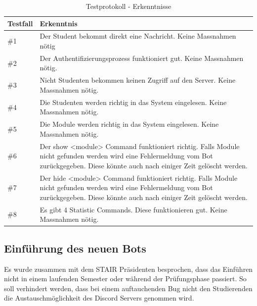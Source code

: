 \documentclass[a4paper, table]{article}
\begin{document}
\begin{table}[h]
    \centering
    \begin{tabular}{|l|p{30em}|}
        \hline
        \rowcolor[gray]{.9} Testfall & Erkenntnis \\
        \hline
        \#1 & Der Student bekommt direkt eine Nachricht. Keine Massnahmen nötig \\
        \hline
        \#2 & Der Authentifizierungsprozess funktioniert gut. Keine Massnahmen nötig. \\
        \hline
        \#3 & Nicht Studenten bekommen keinen Zugriff auf den Server. Keine Massnahmen nötig. \\
        \hline
        \#4 & Die Studenten werden richtig in das System eingelesen. Keine Massnahmen nötig. \\
        \hline
        \#5 & Die Module werden richtig in das System eingelesen. Keine Massnahmen nötig. \\
        \hline
        \#6 & 
            Der show <module> Command funktioniert richtig.
            Falls Module nicht gefunden werden wird eine Fehlermeldung vom Bot zurückgegeben.
            Diese könnte auch nach einiger Zeit gelöscht werden. \\
        \hline
        \#7 & 
            Der hide <module> Command funktioniert richtig.
            Falls Module nicht gefunden werden wird eine Fehlermeldung vom Bot zurückgegeben.
            Diese könnte auch nach einiger Zeit gelöscht werden. \\
        \hline
        \#8 & Es gibt 4 Statistic Commands. Diese funktionieren gut. Keine Massnahmen nötig. \\
        \hline
    \end{tabular}
    \caption{Testprotokoll - Erkenntnisse}
    \label{tab: test-protocol-knowledge}
\end{table}

\subsection{Einführung des neuen Bots}

Es wurde zusammen mit dem STAIR Präsidenten besprochen, dass das Einführen nicht in einem laufenden Semester oder während der Prüfungsphase passiert.
So soll verhindert werden, dass bei einem auftauchenden Bug nicht den Studierenden die Austauschmöglichkeit des Discord Servers genommen wird.

\newpage
\end{document}
